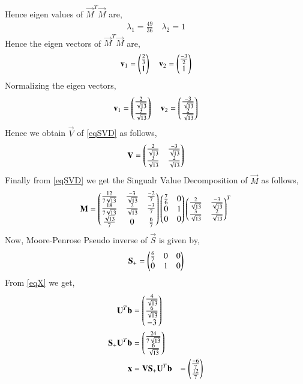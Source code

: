 \documentclass[journal,12pt,twocolumn]{IEEEtran}
\begin{document}
Hence eigen values of $\vec{M}^T\vec{M}$ are,
\begin{align}
\lambda_1 = \frac{49}{36}\quad
\lambda_2 = 1
\end{align}
Hence the eigen vectors of $\vec{M}^T\vec{M}$ are,
\begin{align}
\mathbf{v}_1=\begin{pmatrix}\frac{2}{3}\\1\end{pmatrix} \quad
\mathbf{v}_2=\begin{pmatrix}\frac{-3}{2}\\1\end{pmatrix}
\end{align}
Normalizing the eigen vectors,
\begin{align}
\mathbf{v}_1=\begin{pmatrix}\frac{2}{\sqrt{13}}\\\frac{3}{\sqrt{13}}\end{pmatrix} \quad
\mathbf{v}_2=\begin{pmatrix}\frac{-3}{\sqrt{13}}\\\frac{2}{\sqrt{13}}\end{pmatrix}
\end{align}
Hence we obtain $\vec{V}$ of \eqref{eqSVD} as follows,
\begin{align}
\mathbf{V}=\begin{pmatrix}\frac{2}{\sqrt{13}}&\frac{-3}{\sqrt{13}}\\\frac{3}{\sqrt{13}}&\frac{2}{\sqrt{13}}\end{pmatrix}
\end{align}
Finally from \eqref{eqSVD} we get the Singualr Value Decomposition of $\vec{M}$ as follows,
\begin{align}
\mathbf{M} = \begin{pmatrix}\frac{12}{7\sqrt{13}}&\frac{-3}{\sqrt{13}}&\frac{-2}{7}\\\frac{18}{7\sqrt{13}}&\frac{2}{\sqrt{13}}&\frac{-3}{7}\\\frac{\sqrt{13}}{7}&0&\frac{6}{7}\end{pmatrix}\begin{pmatrix}\frac{7}{6}&0\\0&1\\0&0\end{pmatrix}\begin{pmatrix}\frac{2}{\sqrt{13}}&\frac{-3}{\sqrt{13}}\\\frac{3}{\sqrt{13}}&\frac{2}{\sqrt{13}}\end{pmatrix}^T
\end{align}
Now, Moore-Penrose Pseudo inverse of $\vec{S}$ is given by,
\begin{align}
\mathbf{S_+} =\begin{pmatrix}\frac{6}{7}&0&0\\0&1&0\end{pmatrix}
\end{align}
From \eqref{eqX} we get,
\begin{align}
\mathbf{U}^T\mathbf{b}&=\begin{pmatrix}\frac{4}{\sqrt{13}}\\\frac{6}{\sqrt{13}}\\-3\end{pmatrix}\\
\mathbf{S_+}\mathbf{U}^T\mathbf{b}&=\begin{pmatrix}\frac{24}{7\sqrt{13}}\\\frac{6}{\sqrt{13}}\end{pmatrix}\\
\mathbf{x} &= \mathbf{V}\mathbf{S_+}\mathbf{U}^T\mathbf{b} &= \begin{pmatrix}\frac{-6}{7}\\\frac{12}{7}\end{pmatrix}\label{eqXSol1}
\end{align}
\end{document}
